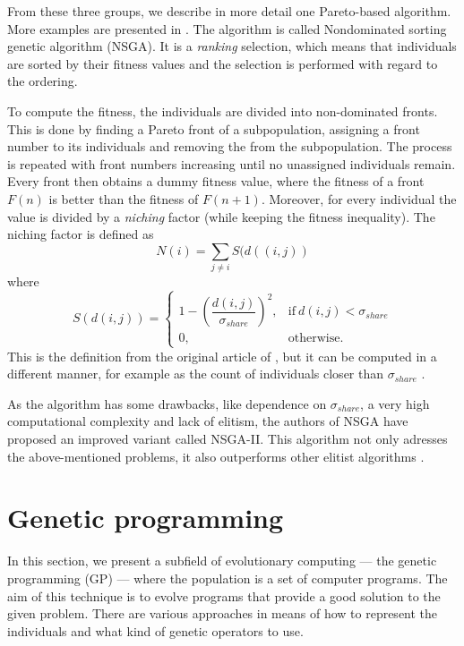 From these three groups, we describe in more detail one Pareto-based algorithm.
More examples are presented in 
\cite[p.~170-173]{Engelbrecht:2007:CII:1557464}.
The algorithm is called Nondominated sorting genetic algorithm (NSGA). It is a
\emph{ranking} selection, which means that individuals are sorted by their
fitness values and the selection is performed with regard to the ordering.

To compute the fitness, the individuals are divided into non-dominated fronts.
This is done by finding a Pareto front of a subpopulation, assigning a
front number to its individuals and removing the from the subpopulation.
The process is repeated with front numbers increasing until no unassigned
individuals remain. Every front then obtains a dummy fitness value, where
the fitness of a front $F(n)$ is better than the fitness of $F(n+1)$. Moreover,
for every individual the value is divided by a \emph{niching} factor (while
keeping the fitness inequality). The 
niching factor is defined as
$$N(i)=\sum_{j\neq i}{S(d((i,j))}$$ where 
\begin{equation}
    S(d(i,j))=
    \begin{cases}
      1 - (\dfrac{d(i,j)}{\sigma_{share}})^2, & \text{if}\ d(i,j) < \sigma_{share} \\
      0, & \text{otherwise.}
    \end{cases}
\end{equation}
This is the definition from the original article of
\cite{Srinivas:1994:MOU:1326668.1326671}, but it can be computed in a different
manner, for example as the count of individuals closer than $\sigma_{share}$
\citep{Engelbrecht:2007:CII:1557464}.

\label{nsgaii}
As the algorithm has some drawbacks, like dependence on $\sigma_{share}$,
a very high computational complexity and lack of elitism, the authors of
NSGA have proposed an improved variant called NSGA-II. This algorithm not only
adresses the above-mentioned problems, it also outperforms other elitist
algorithms \citep{Deb:2002:FEM:2221359.2221582}.

\section{Genetic programming}
In this section, we present a subfield of evolutionary computing --- 
the genetic programming (GP) --- where the population is a set of computer 
programs. The aim of this technique is to evolve programs that provide 
a good solution to the given problem. There are various approaches in means 
of how to represent the individuals and what kind of genetic operators to 
use.

